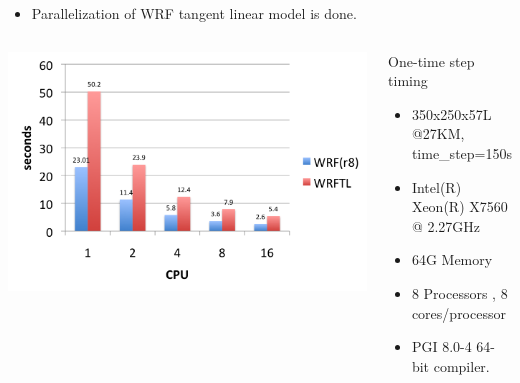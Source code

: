 \documentclass[10pt]{beamer}
\begin{document}
{\begin{itemize}
Implementation of the simplified physics packages into WRFPLUSV3 is done: surface drag(bl\_pbl\_physics=98), large scale condensation(mp\_physics=98) and a simplified cumulus scheme(cu\_physics=98). \pause	
	\item Parallelization of WRF tangent linear model is done. \pause
\end{itemize}
\begin{columns}[c]
\column{6cm}
\begin{center}
\includegraphics[scale=0.33, trim=0 0 0 0, clip]{wrftl_performance.png}
\end{center}
\column[c]{3.5cm}
\begin{block}{One-time step timing}
\begin{itemize}
	\item \tiny{350x250x57L @27KM, time\_step=150s}
	\item Intel(R) Xeon(R) X7560 @ 2.27GHz
	\item 64G Memory
	\item 8 Processors , 8 cores/processor
	\item PGI 8.0-4 64-bit compiler.
\end{itemize}
\end{block}
\end{columns}
}


\end{document}
